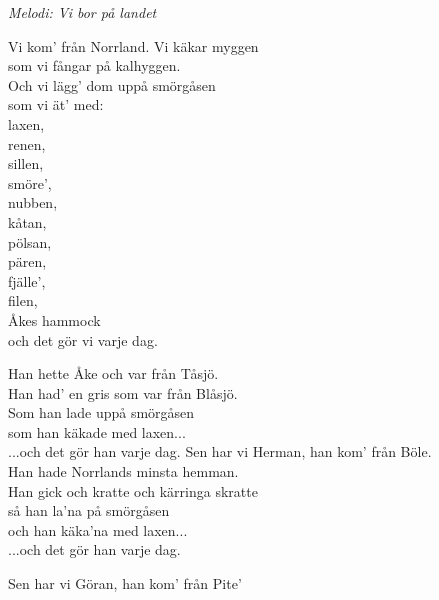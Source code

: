 {\footnotesize\textit{Melodi: Vi bor på landet}}\par
\vspace{10pt}
Vi kom' från Norrland. Vi käkar myggen\\
som vi fångar på kalhyggen.\\
Och vi lägg' dom uppå smörgåsen\\
som vi ät' med:\\
\hspace*{25pt} laxen,\\
\hspace*{25pt} renen,\\
\hspace*{25pt} sillen,\\
\hspace*{25pt} smöre',\\
\hspace*{25pt} nubben,\\
\hspace*{25pt} kåtan,\\
\hspace*{25pt} pölsan,\\
\hspace*{25pt} pären,\\
\hspace*{25pt} fjälle',\\
\hspace*{25pt} filen,\\
\hspace*{25pt} Åkes hammock\\
 och det gör vi varje dag.\par
\vspace{10pt}
Han hette Åke och var från Tåsjö.\\
Han had' en gris som var från Blåsjö.\\
Som han lade uppå smörgåsen\\
som han käkade med laxen...\\
...och det gör han varje dag.
\newpage
Sen har vi Herman, han kom' från Böle.\\
Han hade Norrlands minsta hemman.\\
Han gick och kratte och kärringa skratte\\
så han la'na på smörgåsen\\
och han käka'na med laxen...\\
...och det gör han varje dag.\par
\vspace{7pt}
Sen har vi Göran, han kom' från Pite'\\
